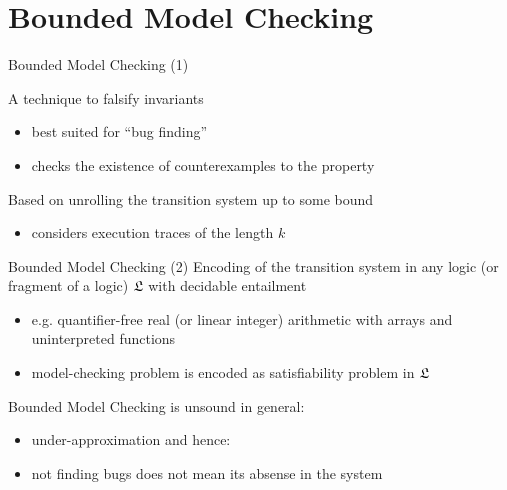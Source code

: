 
\section{Bounded Model Checking}

\begin{frame}{Bounded Model Checking (1)}

A technique to falsify invariants
\begin{itemize}
  \itemsep1em
  \item best suited for ``bug finding''
  \item checks the existence of counterexamples to the property
\end{itemize}

\bigskip
Based on unrolling the transition system up to some bound
\begin{itemize}
  \itemsep1em  
  \item considers execution traces of the length $k$
\end{itemize}
\end{frame}


\begin{frame}{Bounded Model Checking (2)}
Encoding of the transition system in any logic (or fragment of a logic) $\mathfrak{L}$
with decidable entailment
\begin{itemize}
  \itemsep1em
  \item e.g. quantifier-free real (or linear integer) arithmetic with arrays and   
  uninterpreted functions  
  \item model-checking problem is encoded as satisfiability problem in $\mathfrak{L}$
\end{itemize}

\bigskip
Bounded Model Checking is unsound in general:
\begin{itemize}
  \itemsep1em
  \item under-approximation and hence:
  \item not finding bugs does not mean its absense in the system
\end{itemize}
\end{frame}


